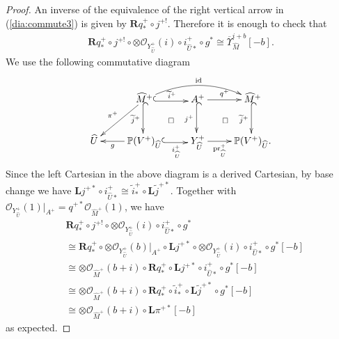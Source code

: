 \documentclass[11pt]{amsart}
\theoremstyle{plain}
\newcommand{\oO}{\mathcal{O}}
\newcommand{\dR}{\mathbf{R}}
\newcommand{\dL}{\mathbf{L}}
\newcommand{\id}{\textrm{id}}
\begin{document}
\begin{proof}
An inverse of the equivalence of the right vertical 
arrow in (\ref{dia:commute3}) is given by
$\dR q^+_{\ast} \circ j^{+!}$. 
Therefore it is enough to check 
that 
\begin{align}\label{e:check}
\dR q^+_{\ast} \circ j^{+!} \circ \otimes \oO_{Y_{\widehat{U}}^+}(i) \circ
i_{\widehat{U}\ast}^+ \circ g^{\ast}
\cong \overline{\Upsilon}_{\widehat{M}}^{i+b}[-b].
\end{align}
We use the following commutative 
diagram
\begin{align*}
\xymatrix{
& \ar[ld]_-{\pi^+} 
\widehat{M}^{+} \ar@<-0.3ex>@{^{(}->}[d]_-{\widetilde{j}^+}
\ar@<-0.3ex>@{^{(}->}[r]^-{\widetilde{i}^+} \ar@{}[dr]|\square 
\ar@/^15pt/[rr]^-{\id} 
& 
A^+ \ar@<-0.3ex>@{^{(}->}[d]_-{j^+}
\ar[r]^-{q^+} \ar@{}[dr]|\square
 & \widehat{M}^{+} \ar@<-0.3ex>@{^{(}->}[d]_-{\widetilde{j}^+} 
 \\
\widehat{U} & \ar[l]^-{g} 
\mathbb{P}(V^+)_{\widehat{U}} \ar@<-0.3ex>@{^{(}->}[r]_-{i_{\widehat{U}}^+} &
Y_{\widehat{U}}^+ \ar[r]_-{\mathrm{pr}^+_{\widehat{U}}} 
& \mathbb{P}(V^+)_{\widehat{U}}.
}
\end{align*}
Since the left Cartesian in the above diagram 
is a derived Cartesian, 
by base change 
we have 
$\dL j^{+\ast} \circ i_{\widehat{U}\ast}^+ \cong
\widetilde{i}^+_{\ast}
\circ \dL \widetilde{j}^{+\ast} $.
Together with $\oO_{Y_{\widehat{U}}^+}(1)|_{A^+}=q^{+\ast}\oO_{\widehat{M}^{+}}(1)$, 
we have  
\begin{align*}
&\dR q^+_{\ast} \circ j^{+!} \circ \otimes \oO_{Y_{\widehat{U}}^+}(i) 
\circ i_{\widehat{U}\ast}^+ \circ g^{\ast} \\
&\cong 
 \dR q^+_{\ast} \circ
\otimes \oO_{Y_{\widehat{U}}^+}(b)|_{A^+} \circ 
\dL j^{+\ast} \circ \otimes \oO_{Y_{\widehat{U}}^+}(i) \circ 
i_{\widehat{U}\ast}^+ \circ g^{\ast}
[-b] \\
&\cong 
\otimes \oO_{\widehat{M}^{+}}(b+i) \circ 
 \dR q^+_{\ast} \circ
\dL j^{+\ast}  \circ 
i_{\widehat{U}\ast}^+ \circ g^{\ast}
[-b] \\
&\cong \otimes \oO_{\widehat{M}^{+}}(b+i) \circ \dR q^+_{\ast} \circ \widetilde{i}^+_{\ast}
\circ \dL \widetilde{j}^{+\ast} \circ g^{\ast}[-b] \\
&\cong \otimes \oO_{\widehat{M}^{+}}(b+i) \circ \dL \pi^{+\ast}[-b]
\end{align*}
as expected. 
\end{proof}
\end{document}
